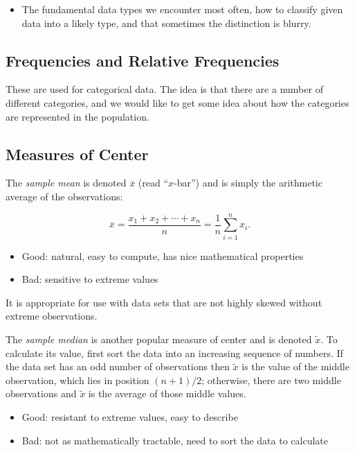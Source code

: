 \documentclass[]{book}
\providecommand{\tightlist}{%
  \setlength{\itemsep}{0pt}\setlength{\parskip}{0pt}}
\numberwithin{equation}{chapter}
\numberwithin{figure}{chapter}
\theoremstyle{plain}
\theoremstyle{definition}
\theoremstyle{remark}
\theoremstyle{definition}
\theoremstyle{definition}
\theoremstyle{remark}
\begin{document}
\begin{itemize}
\tightlist
\item
  The fundamental data types we encounter most often, how to classify
  given data into a likely type, and that sometimes the distinction is
  blurry.
\end{itemize}

\subsection{Frequencies and Relative
Frequencies}\label{sub-frequencies-and-relative}

These are used for categorical data. The idea is that there are a number
of different categories, and we would like to get some idea about how
the categories are represented in the population.

\subsection{Measures of Center}\label{sub-measures-of-center}

The \emph{sample mean} is denoted \(\overline{x}\) (read ``\(x\)-bar'')
and is simply the arithmetic average of the observations:

\begin{equation} 
\overline{x}=\frac{x_{1}+x_{2}+\cdots+x_{n}}{n}=\frac{1}{n}\sum_{i=1}^{n}x_{i}.
\end{equation}

\begin{itemize}
\tightlist
\item
  Good: natural, easy to compute, has nice mathematical properties
\item
  Bad: sensitive to extreme values
\end{itemize}

It is appropriate for use with data sets that are not highly skewed
without extreme observations.

The \emph{sample median} is another popular measure of center and is
denoted \(\tilde{x}\). To calculate its value, first sort the data into
an increasing sequence of numbers. If the data set has an odd number of
observations then \(\tilde{x}\) is the value of the middle observation,
which lies in position \((n+1)/2\); otherwise, there are two middle
observations and \(\tilde{x}\) is the average of those middle values.

\begin{itemize}
\tightlist
\item
  Good: resistant to extreme values, easy to describe
\item
  Bad: not as mathematically tractable, need to sort the data to
  calculate
\end{itemize}
\end{document}

